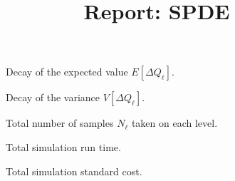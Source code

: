 \documentclass[11pt, oneside]{article}
\title{Report: SPDE}
\date{}
\newlength\figureheight
\newlength\figurewidth
\begin{document}
\maketitle

\begin{figure}[h]
\centering
\setlength{\figureheight}{0.3\textwidth}
\setlength{\figurewidth}{0.3\textwidth}

 \caption{\label{fig:E}Decay of the expected value $E[\Delta Q_\ell]$.}
\end{figure}


\begin{figure}[h]
\centering
\setlength{\figureheight}{0.3\textwidth}
\setlength{\figurewidth}{0.3\textwidth}

 \caption{\label{fig:V}Decay of the variance $V[\Delta Q_\ell]$.}
\end{figure}


\begin{figure}[h]
\centering
\setlength{\figureheight}{0.3\textwidth}
\setlength{\figurewidth}{0.3\textwidth}

 \caption{\label{fig:samples}Total number of samples $N_\ell$ taken on each level.}
\end{figure}


\begin{figure}[h]
\centering
\setlength{\figureheight}{0.3\textwidth}
\setlength{\figurewidth}{0.3\textwidth}

 \caption{\label{fig:time}Total simulation run time.}
\end{figure}


\begin{figure}[h]
\centering
\setlength{\figureheight}{0.3\textwidth}
\setlength{\figurewidth}{0.3\textwidth}

 \caption{\label{fig:cost}Total simulation standard cost.}
\end{figure}
\end{document}

